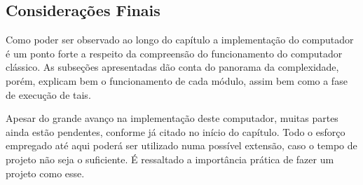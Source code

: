 \subsection{Considerações Finais}

Como poder ser observado ao longo do capítulo a implementação do computador é um ponto forte a respeito da compreensão do funcionamento do computador clássico. As subseções apresentadas dão conta do panorama da complexidade, porém, explicam bem o funcionamento de cada módulo, assim bem como a fase de execução de tais.

Apesar do grande avanço na implementação deste computador, muitas partes ainda estão pendentes, conforme já citado no início do capítulo. Todo o esforço empregado até aqui poderá ser utilizado numa possível extensão, caso o tempo de projeto não seja o suficiente. É ressaltado a importância prática de fazer um projeto como esse.


\newpage


